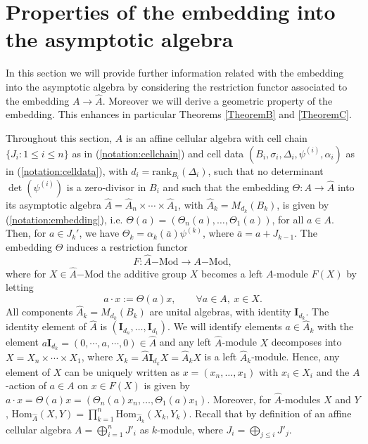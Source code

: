 \documentclass[oneside, a4paper, 11pt]{amsart}
\newcommand{\asym}{\widehat{A}}
\newcommand{\rank}{\mathrm{rank}}
\newcommand{\Hom}{\mathrm{Hom}}
\begin{document}


\section{Properties of the embedding into the asymptotic algebra}


In this section we will provide further information related with the embedding
into the asymptotic algebra by considering the restriction functor associated to the
embedding $A\to \asym$. Moreover we will derive a geometric property of
the embedding. This enhances in particular Theorems \ref{TheoremB} and
\ref{TheoremC}.

Throughout this section, $A$ is an affine cellular algebra with cell chain $\{J_i : 1\leq i \leq n\}$ as in  (\ref{notation:cellchain}) and cell data $(B_i,\sigma_i,\Delta_i, \psi^{(i)}, \alpha_i)$ as in (\ref{notation:celldata}), with $d_i=\rank_{B_i}(\Delta_i)$, such that no determinant $\det(\psi^{(i)})$ is a zero-divisor in $B_i$ and such that the embedding $\Theta: A \to \asym$ into its asymptotic algebra $\asym=\asym_n \times \cdots \times \asym_1$, with $\asym_k=M_{d_k}(B_k)$, is given by (\ref{notation:embedding}), i.e. $\Theta(a)=(\Theta_n(a),\ldots, \Theta_1(a))$, for all $a\in A$. Then, for $a\in J_k'$, we have $\Theta_k =  \alpha_k(\overline{a})\psi^{(k)}$, where $\overline{a}=a+J_{k-1}$. The embedding $\Theta$ induces a restriction functor $$F: \asym\mathrm{-Mod} \to A\mathrm{-Mod},$$ where for $X\in \asym\mathrm{-Mod}$ the additive group $X$ becomes a left $A$-module $F(X)$ by letting
\begin{equation}\label{eq:def-module-structure}
 a\cdot x := \Theta(a)x, \qquad \forall a\in A, \: x\in X.
\end{equation}
All components $\asym_k = M_{d_k}(B_k)$ are unital algebras, with identity $\mathbf{I}_{d_k}$. The identity element of $\asym$ is $\left(\mathbf{I}_{d_n},\ldots, \mathbf{I}_{d_1}\right)$. We will identify elements $a\in \asym_k$ with the element $a\mathbf{I}_{d_k} = (0,\cdots, a, \cdots, 0) \in \asym$ and any left $\asym$-module $X$ decomposes into $X=X_n\times \cdots \times X_1$, where $X_k = \asym \mathbf{I}_{d_k} X =  \asym_k X$ is a left $\asym_k$-module. Hence, any element of $X$ can be uniquely written as $x=(x_n,\ldots, x_1)$ with $x_i\in X_i$ and the $A$-action of $a\in A$ on $x\in F(X)$ is given by $a\cdot x = \Theta(a)x = (\Theta_n(a) x_n, \ldots, \Theta_1(a)x_1)$. Moreover, for $\asym$-modules $X$ and $Y$, 
$\Hom_{\asym}(X,Y) = \prod_{k=1}^n \Hom_{\asym_k}(X_k,Y_k).$ 
Recall that by definition of an affine cellular algebra $A=\bigoplus_{i=1}^n J'_i$ as $k$-module, where $J_i = \bigoplus_{j\leq i} J'_j$.
\end{document}
